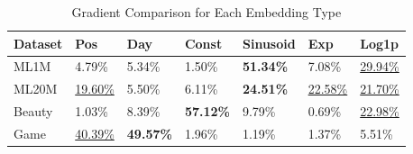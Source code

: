 \begin{table}[ht]
\caption{Gradient Comparison for Each Embedding Type}
\label{tab:grad_cam}
\begin{tabular}{@{}lllllll@{}}
\toprule
{Dataset} & {Pos}           & {Day}              & {Const}            & {Sinusoid}         & {Exp}           & {Log1p}         \\ \midrule
{ML1M}    & {4.79\%}        & {5.34\%}           & {1.50\%}           & {\textbf{51.34\%}} & {7.08\%}        & {\underline{29.94\%}} \\
{ML20M}   & {\underline{19.60\%}} & {5.50\%}           & {6.11\%}           & {\textbf{24.51\%}} & {\underline{22.58\%}} & {\underline{21.70\%}} \\
{Beauty}  & {1.03\%}        & {8.39\%}           & {\textbf{57.12\%}} & {9.79\%}           & {0.69\%}        & {\underline{22.98\%}} \\
{Game}    & {\underline{40.39\%}} & {\textbf{49.57\%}} & {1.96\%}           & {1.19\%}           & {1.37\%}        & {5.51\%}  \\ \bottomrule
\end{tabular}
\end{table}